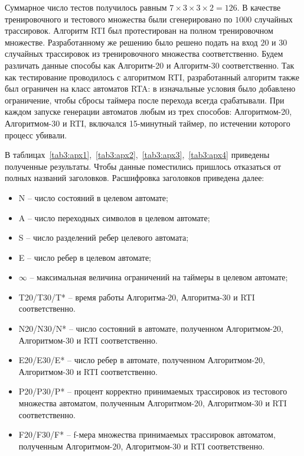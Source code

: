 \documentclass[times,specification,annotation]{itmo-student-thesis}
\begin{document}
Суммарное число тестов получилось равным $7 \times 3 \times 3 \times 2 = 126$. В качестве тренировочного и тестового множества были сгенерировано по $1000$ случайных трассировок. Алгоритм RTI был
протестирован на полном тренировочном множестве. Разработанному же решению было решено подать на вход $20$ и $30$ случайных трассировок из тренировочного множества соответственно.
Будем различать данные способы как Алгоритм-20 и Алгоритм-30 соответственно.
Так как тестирование проводилось с алгоритмом RTI, разработанный алгоритм также был ограничен на класс автоматов RTA:
в изначальные условия было добавлено ограничение, чтобы сбросы таймера после перехода всегда срабатывали. При каждом запуске генерации автоматов любым из трех способов:
Алгоритмом-20, Алгоритмом-30 и RTI, включался 15-минутный таймер, по истечении которого процесс убивали. 

В таблицах~\ref{tab3:apx1},~\ref{tab3:apx2},~\ref{tab3:apx3},~\ref{tab3:apx4} приведены полученные результаты. Чтобы данные поместились пришлось отказаться от полных названий заголовков.
Расшифровка заголовков приведена далее:
\begin{itemize}
  \item N -- число состояний в целевом автомате;
  \item A -- число переходных символов в целевом автомате;
  \item S -- число разделений ребер целевого автомата;
  \item E -- число ребер в целевом автомате;
  \item $\infty$ -- максимальная величина ограничений на таймеры в целевом автомате;
  \item T20\slash T30\slash T* -- время работы Алгоритма-20, Алгоритма-30 и RTI соответственно.
  \item N20\slash N30\slash N* -- число состояний в автомате, полученном Алгоритмом-20, Алгоритмом-30 и RTI соответственно.
  \item E20\slash E30\slash E* -- число ребер в автомате, полученном Алгоритмом-20, Алгоритмом-30 и RTI соответственно.
  \item P20\slash P30\slash P* -- процент корректно принимаемых трассировок из тестового множества автоматом, полученным Алгоритмом-20, Алгоритмом-30 и RTI соответственно.
  \item F20\slash F30\slash F* -- f-мера множества принимаемых трассировок автоматом, полученным Алгоритмом-20, Алгоритмом-30 и RTI соответственно.
\end{itemize}
\end{document}

